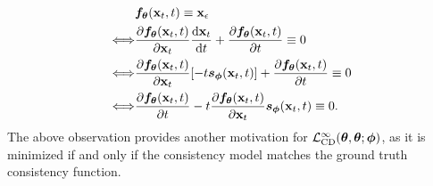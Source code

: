 \begin{appendices}
\begin{remark}
    \begin{align*}
        &{\bm{f}}_{\bm{\theta}}({\mathbf{x}}_t, t) \equiv {\mathbf{x}}_\epsilon\\
        \Longleftrightarrow&\frac{\partial {\bm{f}}_{\bm{\theta}}({\mathbf{x}}_t, t)}{\partial {\mathbf{x}}_t} \frac{\mathop{}\!\mathrm{d} {\mathbf{x}}_t}{\mathop{}\!\mathrm{d} t} + \frac{\partial {\bm{f}}_{\bm{\theta}}({\mathbf{x}}_t, t)}{\partial t} \equiv 0\\
        \Longleftrightarrow&\frac{\partial {\bm{f}}_{\bm{\theta}}({\mathbf{x}}_t, t)}{\partial {\mathbf{x}}_t} [-t {\bm{s}}_{\bm{\phi}}({\mathbf{x}}_t, t)] + \frac{\partial {\bm{f}}_{\bm{\theta}}({\mathbf{x}}_t, t)}{\partial t} \equiv 0\\
        \Longleftrightarrow&\frac{\partial {\bm{f}}_{\bm{\theta}}({\mathbf{x}}_t, t)}{\partial t} - t \frac{\partial {\bm{f}}_{\bm{\theta}}({\mathbf{x}}_t, t)}{\partial {\mathbf{x}}_t} {\bm{s}}_{\bm{\phi}}({\mathbf{x}}_t, t) \equiv 0.
    \end{align*}
    The above observation provides another motivation for $\mathcal{L}_\text{CD}^\infty({\bm{\theta}}, {\bm{\theta}}; {\bm{\phi}})$, as it is minimized if and only if the consistency model matches the ground truth consistency function.
\end{remark}


\end{appendices}
